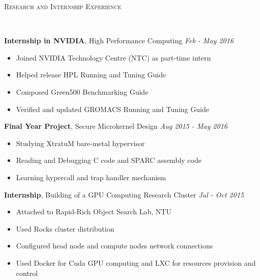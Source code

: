 \documentclass[a4paper, 12pt]{article}
\newenvironment{changemargin}[2]{%
  \begin{list}{}{%
      \setlength{\topsep}{0pt}%
      \setlength{\leftmargin}{#1}%
      \setlength{\rightmargin}{#2}%
      \setlength{\listparindent}{\parindent}%
      \setlength{\itemindent}{\parindent}%
      \setlength{\parsep}{\parskip}%
    }%
  \item[]}{\end{list}
}
\newcommand{\lineover}{
  \begin{changemargin}{-0.05in}{-0.05in}
    \vspace*{-8pt}
    \hrulefill \\
    \vspace*{-2pt}
  \end{changemargin}
}
\newcommand{\header}[1]{
  \begin{changemargin}{-0.6in}{-0.6in}
    \fontsize{15}{15}\scshape{#1}\\
    \lineover
    \vspace*{-4pt}
  \end{changemargin}
}
\newenvironment{body}
{
\vspace*{-16pt}
\begin{changemargin}{-0.25in}{-0.5in}
}
{
\end{changemargin}
}
\begin{document}
\smallskip
\header{Research and Internship Experience}
\begin{body}
  \vspace{14pt}

  \textbf{Internship in NVIDIA}, {High Performance Computing} \hfill \emph{Feb - May 2016}\\
  \vspace*{-6pt}
  \begin{itemize} \itemsep -0pt  \small
  \item Joined NVIDIA Technology Centre (NTC) as part-time intern
  \item Helped release HPL Running and Tuning Guide
  \item Composed Green500 Benchmarking Guide
  \item Verified and updated GROMACS Running and Tuning Guide
  \end{itemize}

  \textbf{Final Year Project}, {Secure Microkernel Design} \hfill \emph{Aug 2015 - May 2016}\\
  \vspace*{-6pt}
  \begin{itemize} \itemsep -0pt  \small
  \item Studying XtratuM bare-metal hypervisor
  \item Reading and Debugging C code and SPARC assembly code
  \item Learning hypercall and trap handler mechanism
  \end{itemize}

  \textbf{Internship}, {Building of a GPU Computing Research Cluster} \hfill \emph{Jul - Oct 2015}\\
  \vspace*{-6pt}
  \begin{itemize} \itemsep -0pt  \small
  \item Attached to Rapid-Rich Object Search Lab, NTU
  \item Used Rocks cluster distribution
  \item Configured head node and compute nodes network connections
  \item Used Docker for Cuda GPU computing and LXC for resources provision and control
  \end{itemize}


\end{body}
\end{document}
